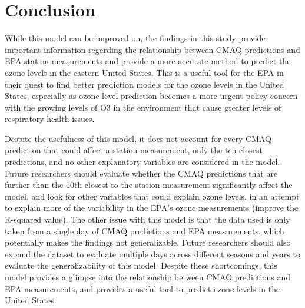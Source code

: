 \documentclass{svproc}
\begin{document}
\section{Conclusion}

While this model can be improved on, the findings in this study provide important information regarding the relationship between CMAQ predictions and EPA station measurements and provide a more accurate method to predict the ozone levels in the eastern United States. This is a useful tool for the EPA in their quest to find better prediction models for the ozone levels in the United States, especially as ozone level prediction becomes a more urgent policy concern with the growing levels of O3 in the environment that cause greater levels of respiratory health issues.

Despite the usefulness of this model, it does not account for every CMAQ prediction that could affect a station measurement, only the ten closest predictions, and no other explanatory variables are considered in the model. Future researchers should evaluate whether the CMAQ predictions that are further than the 10th closest to the station measurement significantly affect the model, and look for other variables that could explain ozone levels, in an attempt to explain more of the variability in the EPA's ozone measurements (improve the R-squared value). The other issue with this model is that the data used is only taken from a single day of CMAQ predictions and EPA measurements, which potentially makes the findings not generalizable. Future researchers should also expand the dataset to evaluate multiple days across different seasons and years to evaluate the generalizability of this model. Despite these shortcomings, this model provides a glimpse into the relationship between CMAQ predictions and EPA measurements, and provides a useful tool to predict ozone levels in the United States.
\end{document}

